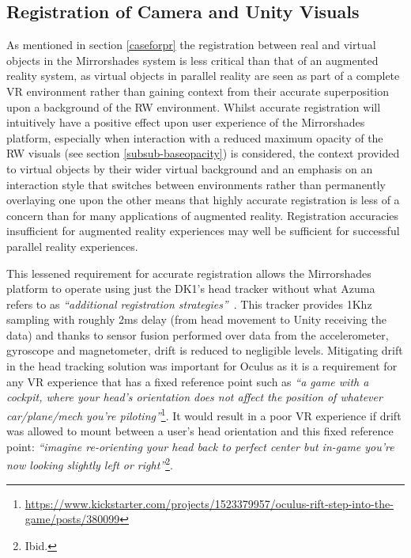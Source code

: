 \subsection{Registration of Camera and Unity Visuals}
\label{registration-of-camera-and-unity-visuals}
As mentioned in section \ref{caseforpr} the registration between real and virtual objects in the Mirrorshades system is less critical than that of an augmented reality system, as virtual objects in parallel reality are seen as part of a complete VR environment rather than gaining context from their accurate superposition upon a background of the RW environment. Whilst accurate registration will intuitively have a positive effect upon user experience of the Mirrorshades platform, especially when interaction with a reduced maximum opacity of the RW visuals (see section \ref{subsub-baseopacity}) is considered, the context provided to virtual objects by their wider virtual background and an emphasis on an interaction style that switches between environments rather than permanently overlaying one upon the other means that highly accurate registration is less of a concern than for many applications of augmented reality. Registration accuracies insufficient for augmented reality experiences may well be sufficient for successful parallel reality experiences.

This lessened requirement for accurate registration allows the Mirrorshades platform to operate using just the DK1's head tracker without what Azuma refers to as \textit{``additional registration strategies''}~\cite{Azuma1997}. This tracker provides 1Khz sampling with roughly 2ms delay (from head movement to Unity receiving the data) and thanks to sensor fusion performed over data from the accelerometer, gyroscope and magnetometer, drift is reduced to negligible levels. Mitigating drift in the head tracking solution was important for Oculus as it is a requirement for any VR experience that has a fixed reference point such as \textit{``a game with a cockpit, where your head's orientation does not affect the position of whatever car/plane/mech you're piloting''}\footnote{\url{https://www.kickstarter.com/projects/1523379957/oculus-rift-step-into-the-game/posts/380099}}\saveFN\rifttrackerfn. It would result in a poor VR experience if drift was allowed to mount between a user's head orientation and this fixed reference point: \textit{``imagine re-orienting your head back to perfect center but in-game you're now looking slightly left or right''}\footnote{Ibid.}.

